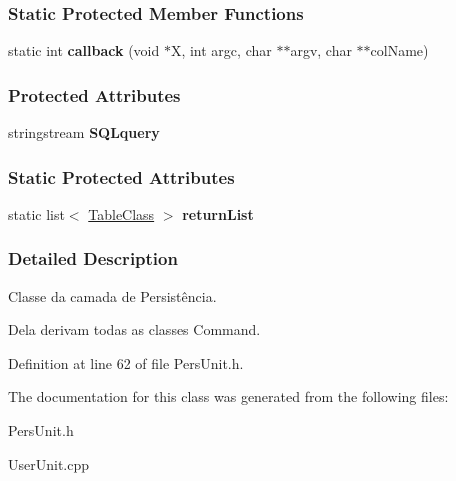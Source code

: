 \subsubsection*{Static Protected Member Functions}
\begin{DoxyCompactItemize}
\item 
\hypertarget{classPersUnit_a26dac4fb8a7aba01dba4ef8492cf1c61}{static int {\bfseries callback} (void $\ast$X, int argc, char $\ast$$\ast$argv, char $\ast$$\ast$col\-Name)}\label{dc/d66/classPersUnit_a26dac4fb8a7aba01dba4ef8492cf1c61}

\end{DoxyCompactItemize}
\subsubsection*{Protected Attributes}
\begin{DoxyCompactItemize}
\item 
\hypertarget{classPersUnit_af186a504441d952845218950e18151fa}{stringstream {\bfseries S\-Q\-Lquery}}\label{dc/d66/classPersUnit_af186a504441d952845218950e18151fa}

\end{DoxyCompactItemize}
\subsubsection*{Static Protected Attributes}
\begin{DoxyCompactItemize}
\item 
\hypertarget{classPersUnit_a7b3f76d74d213e667a8f8e64ac58d328}{static list$<$ \hyperlink{classTableClass}{Table\-Class} $>$ {\bfseries return\-List}}\label{dc/d66/classPersUnit_a7b3f76d74d213e667a8f8e64ac58d328}

\end{DoxyCompactItemize}


\subsubsection{Detailed Description}
Classe da camada de Persistência. 

Dela derivam todas as classes Command. 

Definition at line 62 of file Pers\-Unit.\-h.



The documentation for this class was generated from the following files\-:\begin{DoxyCompactItemize}
\item 
Pers\-Unit.\-h\item 
User\-Unit.\-cpp\end{DoxyCompactItemize}
